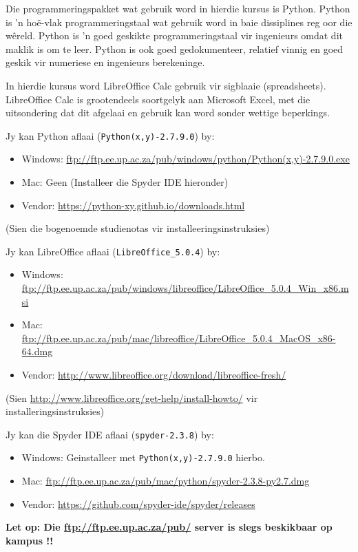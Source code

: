         Die programmeringspakket wat gebruik word in hierdie kursus is Python.
        Python is 'n ho\"{e}-vlak programmeringstaal wat gebruik word in baie
        dissiplines reg oor die w\^{e}reld. Python is 'n goed geskikte
        programmeringstaal vir ingenieurs omdat dit maklik is om te leer.
        Python is ook goed gedokumenteer, relatief vinnig en goed geskik vir
        numeriese en ingenieurs berekeninge.

        In hierdie kursus word LibreOffice Calc gebruik vir sigblaaie
        (spreadsheets). LibreOffice Calc is grootendeels soortgelyk aan
        Microsoft Excel, met die uitsondering dat dit afgelaai en gebruik kan
        word sonder wettige beperkings.

        \noindent
        Jy kan Python aflaai ({\tt Python(x,y)-2.7.9.0}) by:
        \begin{itemize}
            \item Windows: \url{ftp://ftp.ee.up.ac.za/pub/windows/python/Python(x,y)-2.7.9.0.exe}
            \item Mac: Geen (Installeer die Spyder IDE hieronder)
            \item Vendor: \url{https://python-xy.github.io/downloads.html}
        \end{itemize}
        (Sien die bogenoemde studienotas vir installeeringsinstruksies)

        \noindent
        Jy kan LibreOffice aflaai ({\tt LibreOffice\_5.0.4}) by:
        \begin{itemize}
            \item Windows: \url{ftp://ftp.ee.up.ac.za/pub/windows/libreoffice/LibreOffice_5.0.4_Win_x86.msi}
            \item Mac: \url{ftp://ftp.ee.up.ac.za/pub/mac/libreoffice/LibreOffice_5.0.4_MacOS_x86-64.dmg}
            \item Vendor: \url{http://www.libreoffice.org/download/libreoffice-fresh/}
        \end{itemize}
        (Sien \url{http://www.libreoffice.org/get-help/install-howto/} vir
        installeringsinstruksies)

        \noindent
        Jy kan die Spyder IDE aflaai ({\tt spyder-2.3.8}) by:
        \begin{itemize}
            \item Windows: Geinstalleer met {\tt Python(x,y)-2.7.9.0} hierbo.
            \item Mac: \url{ftp://ftp.ee.up.ac.za/pub/mac/python/spyder-2.3.8-py2.7.dmg}
            \item Vendor: \url{https://github.com/spyder-ide/spyder/releases}
        \end{itemize}

        \noindent
        \textbf{Let op: Die \url{ftp://ftp.ee.up.ac.za/pub/} server is slegs
        beskikbaar op kampus !!}
